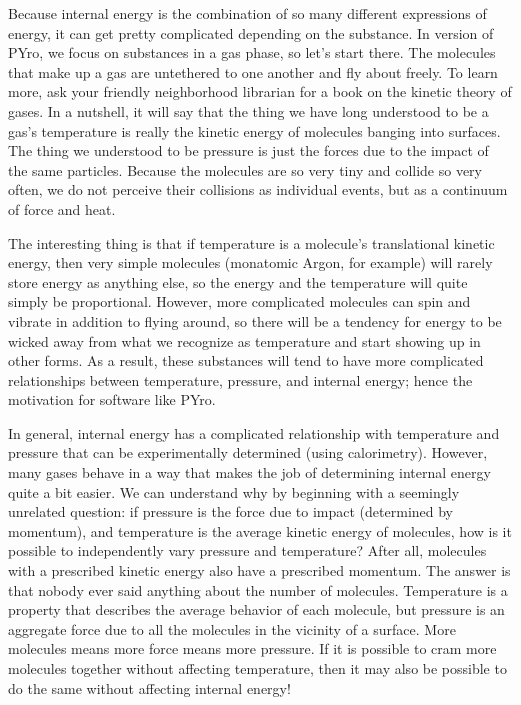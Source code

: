 Because internal energy is the combination of so many different expressions of energy, it can get pretty complicated depending on the substance.  In version \version{} of PYro, we focus on substances in a gas phase, so let's start there.  The molecules that make up a gas are untethered to one another and fly about freely.  To learn more, ask your friendly neighborhood librarian for a book on the kinetic theory of gases.  In a nutshell, it will say that the thing we have long understood to be a gas's temperature is really the kinetic energy of molecules banging into surfaces.  The thing we understood to be pressure is just the forces due to the impact of the same particles.  Because the molecules are so very tiny and collide so very often, we do not perceive their collisions as individual events, but as a continuum of force and heat.

The interesting thing is that if temperature is a molecule's translational kinetic energy, then very simple molecules (monatomic Argon, for example) will rarely store energy as anything else, so the energy and the temperature will quite simply be proportional.  However, more complicated molecules can spin and vibrate in addition to flying around, so there will be a tendency for energy to be wicked away from what we recognize as temperature and start showing up in other forms.  As a result, these substances will tend to have more complicated relationships between temperature, pressure, and internal energy; hence the motivation for software like PYro.

In general, internal energy has a complicated relationship with temperature and pressure that can be experimentally determined (using calorimetry).  However, many gases behave in a way that makes the job of determining internal energy quite a bit easier.  We can understand why by beginning with a seemingly unrelated question: if pressure is the force due to impact (determined by momentum), and temperature is the average kinetic energy of molecules, how is it possible to independently vary pressure and temperature?  After all, molecules with a prescribed kinetic energy also have a prescribed momentum.  The answer is that nobody ever said anything about the number of molecules.  Temperature is a property that describes the average behavior of each molecule, but pressure is an aggregate force due to all the molecules in the vicinity of a surface.  More molecules means more force means more pressure.  If it is possible to cram more molecules together without affecting temperature, then it may also be possible to do the same without affecting internal energy!

